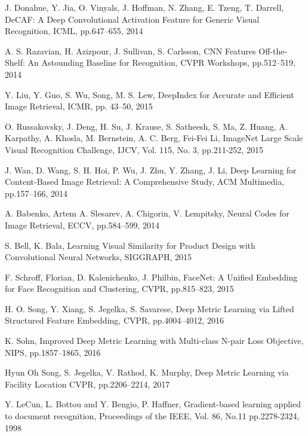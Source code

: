 \documentclass[9pt,technote,compsoc]{./sty/IEEEtran}
\begin{document}
\begin{thebibliography}{1}

J. Donahue, Y. Jia, O. Vinyals, J. Hoffman, N. Zhang, E. Tzeng, T. Darrell,
DeCAF: A Deep Convolutional Activation Feature for Generic Visual Recognition,
ICML, pp.647--655, 2014

A. S. Razavian, H. Azizpour, J. Sullivan, S. Carlsson, 
CNN Features Off-the-Shelf: An Astounding Baseline for Recognition,
CVPR Workshops, pp.512--519, 2014

Y. Liu, Y. Guo, S. Wu, Song, M. S. Lew,
DeepIndex for Accurate and Efficient Image Retrieval,
ICMR, pp. 43--50, 2015

O. Russakovsky, J. Deng, H. Su, J. Krause, S. Satheesh, S. Ma,  Z. Huang, A. Karpathy, A. Khosla, 
M. Bernstein, A. C. Berg, Fei-Fei Li,
ImageNet Large Scale Visual Recognition Challenge,
IJCV, Vol. 115, No. 3, pp.211-252, 2015

J. Wan, D. Wang, S. H. Hoi, P. Wu, J. Zhu, Y. Zhang, J. Li, 
Deep Learning for Content-Based Image Retrieval: A Comprehensive Study,
ACM Multimedia, pp.157--166, 2014

A. Babenko, Artem A. Slesarev, A. Chigorin, V. Lempitsky,
Neural Codes for Image Retrieval,
ECCV, pp.584--599, 2014

S. Bell, K. Bala,
Learning Visual Similarity for Product Design with Convolutional Neural Networks,
SIGGRAPH, 2015

F. Schroff, Florian,  D. Kalenichenko, J. Philbin, 
FaceNet: A Unified Embedding for Face Recognition and Clustering,
CVPR, pp.815--823, 2015

H. O. Song,  Y. Xiang,  S. Jegelka, S. Savarese,
Deep Metric Learning via Lifted Structured Feature Embedding,
CVPR, pp.4004--4012, 2016

K. Sohn, Improved Deep Metric Learning with Multi-class N-pair Loss Objective,
NIPS, pp.1857--1865, 2016

Hyun Oh Song, S. Jegelka, V. Rathod, K. Murphy, Deep Metric Learning via Facility Location
CVPR, pp.2206--2214, 2017

Y. LeCun, L. Bottou and Y. Bengio, P. Haffner,
Gradient-based learning applied to document recognition,
Proceedings of the IEEE, Vol. 86, No.11 pp.2278-2324, 1998 


\end{thebibliography}
\end{document}

